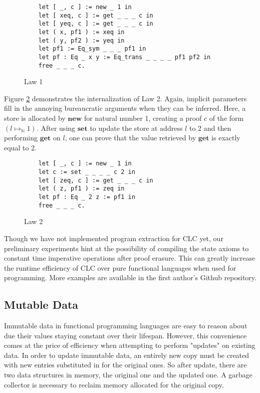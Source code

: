 \documentclass[sigplan,screen]{acmart}
\theoremstyle{definition}
\newcommand{\new}{\textbf{new}}
\newcommand{\get}{\textbf{get}}
\newcommand{\set}{\textbf{set}}
\begin{document}
  \begin{figure}[h]
    \vspace{-1em}
    \caption{Law 1}
    \begin{lstlisting}
    let [ _, c ] := new _ 1 in
    let [ xeq, c ] := get _ _ _ c in
    let [ yeq, c ] := get _ _ _ c in
    let ( x, pf1 ) := xeq in
    let ( y, pf2 ) := yeq in
    let pf1 := Eq_sym _ _ _ pf1 in
    let pf : Eq _ x y := Eq_trans _ _ _ _ pf1 pf2 in
    free _ _ _ c.
    \end{lstlisting}
    \vspace{-1em}
    \label{law1}
    \Description{}
  \end{figure}

  Figure \ref{law2} demonstrates the internalization of Law 2. Again, implicit parameters fill in the annoying bureaucratic arguments when they can be inferred. Here, a store is allocated by $\new$ for natural number 1, creating a proof $c$ of the form $(l \mapsto_\mathbb{N} 1)$. After using $\set$ to update the store at address $l$ to 2 and then performing $\get$ on $l$, one can prove that the value retrieved by $\get$ is exactly equal to 2.

  \begin{figure}[h]
    \vspace{-1em}
    \caption{Law 2}
    \begin{lstlisting}
    let [ _, c ] := new _ 1 in
    let c := set _ _ _ _ c 2 in
    let [ zeq, c ] := get _ _ _ c in
    let ( z, pf1 ) := zeq in
    let pf : Eq _ 2 z := pf1 in
    free _ _ _ c.
    \end{lstlisting}
    \vspace{-1em}
    \label{law2}
    \Description{}
  \end{figure}

  Though we have not implemented program extraction for CLC yet, our preliminary experiments hint at the possibility of compiling the state axioms to constant time imperative operations after proof erasure. This can greatly increase the runtime efficiency of CLC over pure functional languages when used for programming. More examples are available in the first author's Github repository.

  \subsection{Mutable Data}
  Immutable data in functional programming languages are easy to reason about due their values staying constant over their lifespan. However, this convenience comes at the price of efficiency when attempting to perform "updates" on existing data. In order to update immutable data, an entirely new copy must be created with new entries substituted in for the original ones. So after update, there are two data structures in memory, the original one and the updated one. A garbage collector is necessary to reclaim memory allocated for the original copy.
\end{document}
